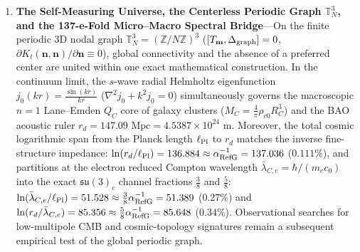 \documentclass[11pt,a4paper]{article}
\begin{document}
\begin{enumerate}[label=\arabic*.]
\item \textbf{The Self-Measuring Universe, the Centerless Periodic Graph $\mathbb{T}^3_N$, and the 137-e-Fold Micro--Macro Spectral Bridge}---On the finite periodic 3D nodal graph $\mathbb{T}^3_N = (\mathbb{Z}/N\mathbb{Z})^3$ ($[T_{\mathbf{m}}, \Delta_{\rm graph}] = 0$, $\partial K_t(\mathbf{n},\mathbf{n})/\partial\mathbf{n} \equiv 0$), global connectivity and the absence of a preferred center are united within one exact mathematical construction. In the continuum limit, the $s$-wave radial Helmholtz eigenfunction $j_0(kr) = \frac{\sin(kr)}{kr}$ ($\nabla^2 j_0 + k^2 j_0 = 0$) simultaneously governs the macroscopic $n=1$ Lane--Emden $Q_C$ core of galaxy clusters ($M_C = \frac{4}{\pi}\rho_{c0}R_C^3$) and the BAO acoustic ruler $r_d = 147.09\text{ Mpc} = 4.5387\times 10^{24}\text{ m}$. Moreover, the total cosmic logarithmic span from the Planck length $\ell_{\rm Pl}$ to $r_d$ matches the inverse fine-structure impedance: \textbf{$\ln(r_d/\ell_{\rm Pl}) = 136.884 \approx \alpha_{\rm RefG}^{-1} = 137.036$} (\textbf{$0.111\%$}), and partitions at the electron reduced Compton wavelength $\bar{\lambda}_{C,e} = \hbar/(m_e c_0)$ into the exact $\mathfrak{su}(3)_c$ channel fractions $\frac{3}{8}$ and $\frac{5}{8}$: $\ln(\bar{\lambda}_{C,e}/\ell_{\rm Pl}) = 51.528 \approx \frac{3}{8}\alpha_{\rm RefG}^{-1} = 51.389$ ($0.27\%$) and $\ln(r_d/\bar{\lambda}_{C,e}) = 85.356 \approx \frac{5}{8}\alpha_{\rm RefG}^{-1} = 85.648$ ($0.34\%$). Observational searches for low-multipole CMB and cosmic-topology signatures remain a subsequent empirical test of the global periodic graph.
\end{enumerate}

{}
\nocite{arnowitt1962,komar1959}
\nocite{abdulkarim2025,brout2022,mandelbrot1982,milne1935,milne1948,planck2020,michell1784,kleinert2008}


\end{document}
